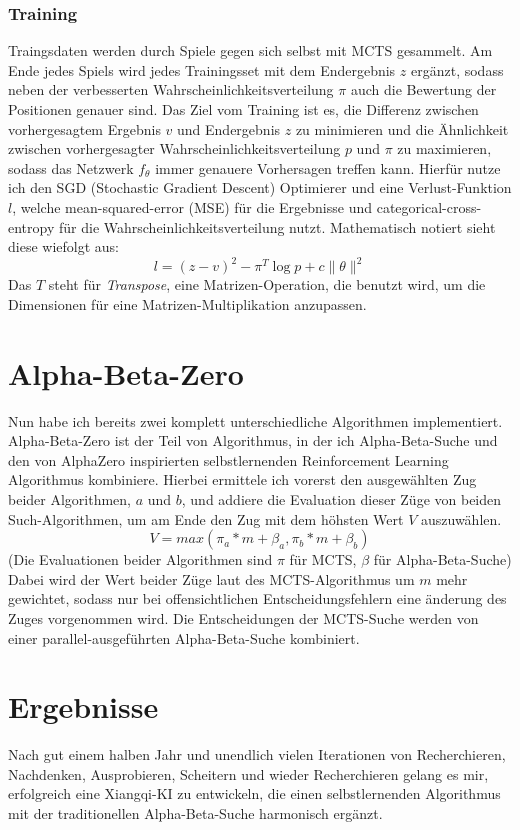 \documentclass{jpp}
\begin{document}
\subsubsection{Training}
Traingsdaten werden durch Spiele gegen sich selbst mit MCTS gesammelt. Am Ende jedes Spiels wird jedes Trainingsset mit dem Endergebnis $z$ ergänzt, sodass neben der verbesserten Wahrscheinlichkeitsverteilung $\pi$ auch die Bewertung der Positionen genauer sind. Das Ziel vom Training ist es, die Differenz zwischen vorhergesagtem Ergebnis $v$ und Endergebnis $z$ zu minimieren und die Ähnlichkeit zwischen vorhergesagter Wahrscheinlichkeitsverteilung $p$ und $\pi$ zu maximieren, sodass das Netzwerk $f_\theta$ immer genauere Vorhersagen treffen kann.
Hierfür nutze ich den SGD (Stochastic Gradient Descent) Optimierer und eine Verlust-Funktion $l$, welche mean-squared-error (MSE) für die Ergebnisse und categorical-cross-entropy für die Wahrscheinlichkeitsverteilung nutzt. Mathematisch notiert sieht diese wiefolgt aus:
\[
l = (z - v)^2 - \pi^T \log p + c\lVert \theta \rVert^2
\]
Das $T$ steht für \textit{Transpose}, eine Matrizen-Operation, die benutzt wird, um die Dimensionen für eine Matrizen-Multiplikation anzupassen.
\section{Alpha-Beta-Zero}
Nun habe ich bereits zwei komplett unterschiedliche Algorithmen implementiert.
Alpha-Beta-Zero ist der Teil von Algorithmus, in der ich Alpha-Beta-Suche und den von AlphaZero inspirierten selbstlernenden Reinforcement Learning Algorithmus kombiniere. Hierbei ermittele ich vorerst den ausgewählten Zug beider Algorithmen, $a$ und $b$, und addiere die Evaluation dieser Züge von beiden Such-Algorithmen, um am Ende den Zug mit dem höhsten Wert $V$ auszuwählen.
\[V = max(\pi_a * m + \beta_a, \pi_b * m + \beta_b)\] (Die Evaluationen beider Algorithmen sind $\pi$ für MCTS, $\beta$ für Alpha-Beta-Suche)
Dabei wird der Wert beider Züge laut des MCTS-Algorithmus um $m$ mehr gewichtet, sodass nur bei offensichtlichen Entscheidungsfehlern eine änderung des Zuges vorgenommen wird. Die Entscheidungen der MCTS-Suche werden von einer parallel-ausgeführten Alpha-Beta-Suche kombiniert.

\section{Ergebnisse}
Nach gut einem halben Jahr und unendlich vielen Iterationen von Recherchieren, Nachdenken, Ausprobieren, Scheitern und wieder Recherchieren gelang es mir, erfolgreich eine Xiangqi-KI zu entwickeln, die einen selbstlernenden Algorithmus mit der traditionellen Alpha-Beta-Suche harmonisch ergänzt. 
\end{document}
